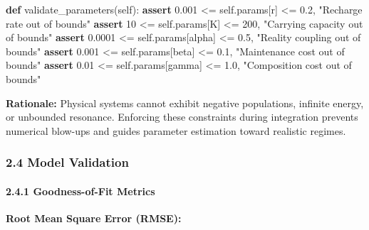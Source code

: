 \documentclass[
]{article}
\newenvironment{Shaded}{}{}
\newcommand{\ControlFlowTok}[1]{\textcolor[rgb]{0.00,0.44,0.13}{\textbf{#1}}}
\newcommand{\DecValTok}[1]{\textcolor[rgb]{0.25,0.63,0.44}{#1}}
\newcommand{\FloatTok}[1]{\textcolor[rgb]{0.25,0.63,0.44}{#1}}
\newcommand{\KeywordTok}[1]{\textcolor[rgb]{0.00,0.44,0.13}{\textbf{#1}}}
\newcommand{\NormalTok}[1]{#1}
\newcommand{\OperatorTok}[1]{\textcolor[rgb]{0.40,0.40,0.40}{#1}}
\newcommand{\StringTok}[1]{\textcolor[rgb]{0.25,0.44,0.63}{#1}}
\newcommand{\VariableTok}[1]{\textcolor[rgb]{0.10,0.09,0.49}{#1}}
\begin{document}
\begin{Shaded}
\begin{Highlighting}[]
\KeywordTok{def}\NormalTok{ validate\_parameters(}\VariableTok{self}\NormalTok{):}
    \ControlFlowTok{assert} \FloatTok{0.001} \OperatorTok{\textless{}=} \VariableTok{self}\NormalTok{.params[}\StringTok{\textquotesingle{}r\textquotesingle{}}\NormalTok{] }\OperatorTok{\textless{}=} \FloatTok{0.2}\NormalTok{, }\StringTok{"Recharge rate out of bounds"}
    \ControlFlowTok{assert} \DecValTok{10} \OperatorTok{\textless{}=} \VariableTok{self}\NormalTok{.params[}\StringTok{\textquotesingle{}K\textquotesingle{}}\NormalTok{] }\OperatorTok{\textless{}=} \DecValTok{200}\NormalTok{, }\StringTok{"Carrying capacity out of bounds"}
    \ControlFlowTok{assert} \FloatTok{0.0001} \OperatorTok{\textless{}=} \VariableTok{self}\NormalTok{.params[}\StringTok{\textquotesingle{}alpha\textquotesingle{}}\NormalTok{] }\OperatorTok{\textless{}=} \FloatTok{0.5}\NormalTok{, }\StringTok{"Reality coupling out of bounds"}
    \ControlFlowTok{assert} \FloatTok{0.001} \OperatorTok{\textless{}=} \VariableTok{self}\NormalTok{.params[}\StringTok{\textquotesingle{}beta\textquotesingle{}}\NormalTok{] }\OperatorTok{\textless{}=} \FloatTok{0.1}\NormalTok{, }\StringTok{"Maintenance cost out of bounds"}
    \ControlFlowTok{assert} \FloatTok{0.01} \OperatorTok{\textless{}=} \VariableTok{self}\NormalTok{.params[}\StringTok{\textquotesingle{}gamma\textquotesingle{}}\NormalTok{] }\OperatorTok{\textless{}=} \FloatTok{1.0}\NormalTok{, }\StringTok{"Composition cost out of bounds"}
\end{Highlighting}
\end{Shaded}

\textbf{Rationale:} Physical systems cannot exhibit negative
populations, infinite energy, or unbounded resonance. Enforcing these
constraints during integration prevents numerical blow-ups and guides
parameter estimation toward realistic regimes.

\subsubsection{2.4 Model Validation}\label{model-validation}

\paragraph{2.4.1 Goodness-of-Fit Metrics}\label{goodness-of-fit-metrics}

\textbf{Root Mean Square Error (RMSE):}
\end{document}
